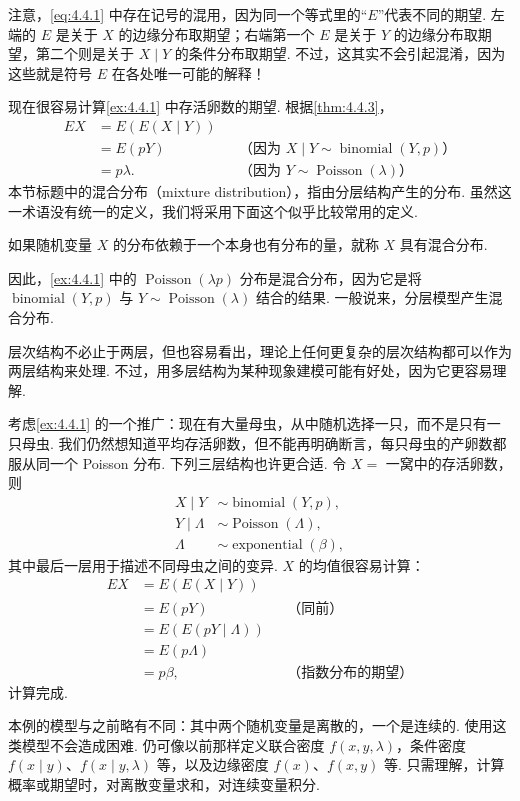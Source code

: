注意，\eqref{eq:4.4.1} 中存在记号的混用，因为同一个等式里的“$E$”代表不同的期望. 左端的 $E$ 是关于 $X$ 的边缘分布取期望；右端第一个 $E$ 是关于 $Y$ 的边缘分布取期望，第二个则是关于 $X\mid Y$ 的条件分布取期望. 不过，这其实不会引起混淆，因为这些就是符号 $E$ 在各处唯一可能的解释！

现在很容易计算\autoref{ex:4.4.1} 中存活卵数的期望. 根据\autoref{thm:4.4.3}，
$$\begin{aligned}
EX&=E(E(X\mid Y))\\
&=E(pY)&&\text{（因为 $X\mid Y\sim\operatorname{binomial}(Y,p)$）}\\
&=p\lambda.&&\text{（因为 $Y\sim\operatorname{Poisson}(\lambda)$）}
\end{aligned}$$
本节标题中的混合分布（mixture distribution），指由分层结构产生的分布. 虽然这一术语没有统一的定义，我们将采用下面这个似乎比较常用的定义.
\begin{definition}\label{def:4.4.4}
如果随机变量 $X$ 的分布依赖于一个本身也有分布的量，就称 $X$ 具有混合分布.
\end{definition}
因此，\autoref{ex:4.4.1} 中的 $\operatorname{Poisson}(\lambda p)$ 分布是混合分布，因为它是将 $\operatorname{binomial}(Y,p)$ 与 $Y\sim\operatorname{Poisson}(\lambda)$ 结合的结果. 一般说来，分层模型产生混合分布.

层次结构不必止于两层，但也容易看出，理论上任何更复杂的层次结构都可以作为两层结构来处理. 不过，用多层结构为某种现象建模可能有好处，因为它更容易理解.
\begin{example}\label{ex:4.4.5}
考虑\autoref{ex:4.4.1} 的一个推广：现在有大量母虫，从中随机选择一只，而不是只有一只母虫. 我们仍然想知道平均存活卵数，但不能再明确断言，每只母虫的产卵数都服从同一个 Poisson 分布. 下列三层结构也许更合适. 令 $X=$ 一窝中的存活卵数，则
$$\begin{aligned}
X\mid Y&\sim\operatorname{binomial}(Y,p),\\
Y\mid\Lambda&\sim\operatorname{Poisson}(\Lambda),\\
\Lambda&\sim\operatorname{exponential}(\beta),
\end{aligned}$$
其中最后一层用于描述不同母虫之间的变异. $X$ 的均值很容易计算：
$$\begin{aligned}
EX&=E(E(X\mid Y))\\
&=E(pY)&&\text{（同前）}\\
&=E(E(pY\mid\Lambda))\\
&=E(p\Lambda)\\
&=p\beta,&&\text{（指数分布的期望）}
\end{aligned}$$
计算完成.
\end{example}
本例的模型与之前略有不同：其中两个随机变量是离散的，一个是连续的. 使用这类模型不会造成困难. 仍可像以前那样定义联合密度 $f(x,y,\lambda)$，条件密度 $f(x\mid y)$、$f(x\mid y,\lambda)$ 等，以及边缘密度 $f(x)$、$f(x,y)$ 等. 只需理解，计算概率或期望时，对离散变量求和，对连续变量积分.

